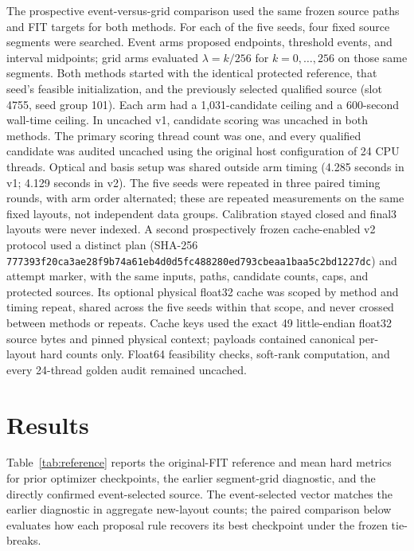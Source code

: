\documentclass[conference]{IEEEtran}
\begin{document}
The prospective event-versus-grid comparison used the same frozen source paths and FIT targets for both methods. For each of the five seeds, four fixed source segments were searched. Event arms proposed endpoints, threshold events, and interval midpoints; grid arms evaluated $\lambda=k/256$ for $k=0,\ldots,256$ on those same segments. Both methods started with the identical protected reference, that seed's feasible initialization, and the previously selected qualified source (slot 4755, seed group 101). Each arm had a 1,031-candidate ceiling and a 600-second wall-time ceiling. In uncached v1, candidate scoring was uncached in both methods. The primary scoring thread count was one, and every qualified candidate was audited uncached using the original host configuration of 24 CPU threads. Optical and basis setup was shared outside arm timing (4.285 seconds in v1; 4.129 seconds in v2). The five seeds were repeated in three paired timing rounds, with arm order alternated; these are repeated measurements on the same fixed layouts, not independent data groups. Calibration stayed closed and final3 layouts were never indexed. A second prospectively frozen cache-enabled v2 protocol used a distinct plan (SHA-256 \texttt{777393f20ca3ae28f9b74a61eb4d0d5fc488280ed793cbeaa1baa5c2bd1227dc}) and attempt marker, with the same inputs, paths, candidate counts, caps, and protected sources. Its optional physical float32 cache was scoped by method and timing repeat, shared across the five seeds within that scope, and never crossed between methods or repeats. Cache keys used the exact 49 little-endian float32 source bytes and pinned physical context; payloads contained canonical per-layout hard counts only. Float64 feasibility checks, soft-rank computation, and every 24-thread golden audit remained uncached.

\section{Results}
Table~\ref{tab:reference} reports the original-FIT reference and mean hard metrics for prior optimizer checkpoints, the earlier segment-grid diagnostic, and the directly confirmed event-selected source. The event-selected vector matches the earlier diagnostic in aggregate new-layout counts; the paired comparison below evaluates how each proposal rule recovers its best checkpoint under the frozen tie-breaks.
\end{document}

